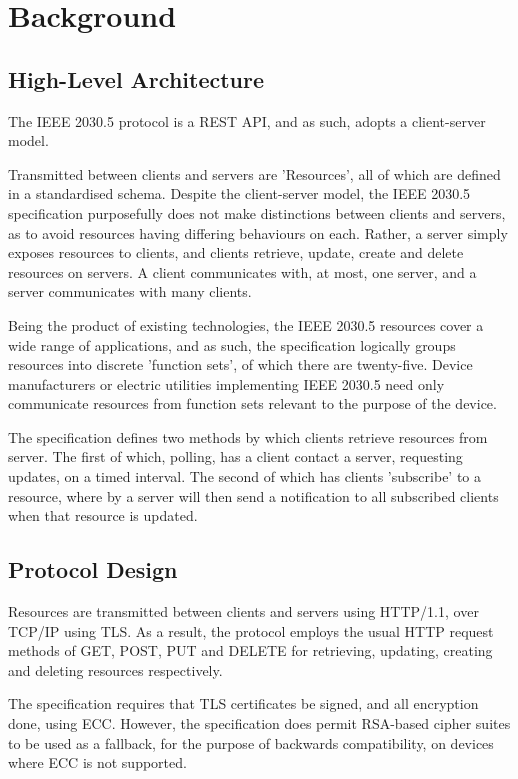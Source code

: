 \chapter{Background}\label{ch:background}

\section{High-Level Architecture}
The IEEE 2030.5 protocol is a REST API, and as such, adopts a client-server model.

Transmitted between clients and servers are 'Resources', all of which are defined in a standardised schema. 
Despite the client-server model, the IEEE 2030.5 specification purposefully does not make distinctions between clients and servers, as to avoid resources having differing behaviours on each. Rather, a server simply exposes resources to clients, and clients retrieve, update, create and delete resources on servers.
A client communicates with, at most, one server, and a server communicates with many clients.

Being the product of existing technologies, the IEEE 2030.5 resources cover a wide range of applications, and as such, the specification logically groups resources into discrete 'function sets', of which there are twenty-five. 
Device manufacturers or electric utilities implementing IEEE 2030.5 need only communicate resources from function sets relevant to the purpose of the device. 

The specification defines two methods by which clients retrieve resources from server. The first of which, polling, has a client contact a server, requesting updates, on a timed interval. 
The second of which has clients 'subscribe' to a resource, where by a server will then send a notification to all subscribed clients when that resource is updated.
\cite{IEEE2030.5}

\section{Protocol Design}
Resources are transmitted between clients and servers using HTTP/1.1, over TCP/IP using TLS.
As a result, the protocol employs the usual HTTP request methods of GET, POST, PUT and DELETE for retrieving, updating, creating and deleting resources respectively.

The specification requires that TLS certificates be signed, and all encryption done, using ECC. 
However, the specification does permit RSA-based cipher suites to be used as a fallback, for the purpose of backwards compatibility, on devices where ECC is not supported.

